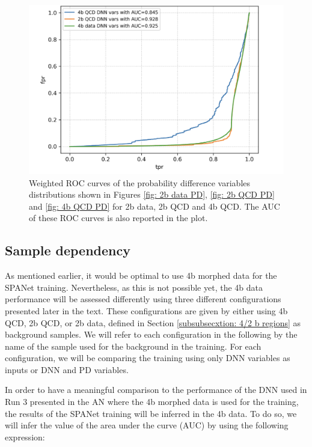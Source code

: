 \begin{figure}
    \centering
    \includegraphics[width=0.7\linewidth]{Images/7.S:B/Prob diff/Probability difference ROC curve.png}
    \caption{Weighted ROC curves of the probability difference variables distributions shown in Figures \ref{fig: 2b data PD}, \ref{fig: 2b QCD PD} and \ref{fig: 4b QCD PD} for 2b data, 2b QCD and 4b QCD. The AUC of these ROC curves is also reported in the plot.}
    \label{fig: ROC PD}
\end{figure}

\clearpage

\subsection{Sample dependency} \label{subsection: sample dep}

As mentioned earlier, it would be optimal to use 4b morphed data for the SPANet training. Nevertheless, as this is not possible yet, the 4b data performance will be assessed differently using three different configurations presented later in the text. These configurations are given by either using 4b QCD, 2b QCD, or 2b data, defined in Section \ref{subsubsecxtion: 4/2 b regions} as background samples. We will refer to each configuration in the following by the name of the sample used for the background in the training. For each configuration, we will be comparing the training using only DNN variables as inputs or DNN and PD variables.

In order to have a meaningful comparison to the performance of the DNN used in Run 3 presented in the AN \cite{ANRun3} where the 4b morphed data is used for the training, the results of the SPANet training will be inferred in the 4b data. To do so, we will infer the value of the area under the curve (AUC) by using the following expression:


